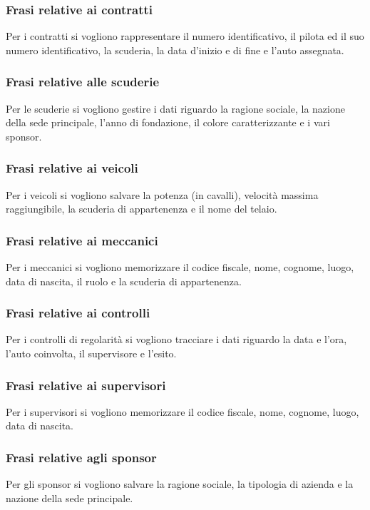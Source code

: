 \documentclass[11pt]{article}
\begin{document}
\subsubsection*{Frasi relative ai contratti}
Per i contratti si vogliono rappresentare il numero identificativo, il pilota ed il suo numero identificativo, la scuderia, 
la data d'inizio e di fine e l'auto assegnata.

\subsubsection*{Frasi relative alle scuderie}
Per le scuderie si vogliono gestire i dati riguardo la ragione sociale, la nazione della sede principale, l'anno di fondazione, il colore caratterizzante e i vari sponsor.

\subsubsection*{Frasi relative ai veicoli}
Per i veicoli si vogliono salvare la potenza (in cavalli), velocità massima raggiungibile, la scuderia di appartenenza e il nome del telaio.

\subsubsection*{Frasi relative ai meccanici}
Per i meccanici si vogliono memorizzare il codice fiscale, nome, cognome, luogo, data di nascita, il ruolo e la scuderia di appartenenza.

\subsubsection*{Frasi relative ai controlli}
Per i controlli di regolarità si vogliono tracciare i dati riguardo la data e l'ora, l'auto coinvolta, il supervisore e l'esito.

\subsubsection*{Frasi relative ai supervisori}
Per i supervisori si vogliono memorizzare il codice fiscale, nome, cognome, luogo, data di nascita.

\subsubsection*{Frasi relative agli sponsor}
Per gli sponsor si vogliono salvare la ragione sociale, la tipologia di azienda e la nazione della sede principale.
\end{document}

